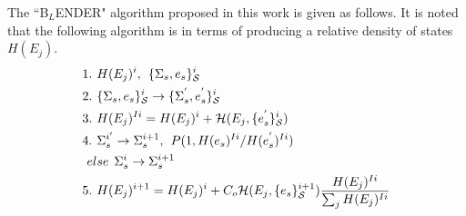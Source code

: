 \documentclass[twocolumn]{article}
\begin{document}
The ``B$_{L}$ENDER" algorithm proposed in this work  is given as follows. It is noted that the following algorithm is in terms of producing a relative density of states $H(E_j)$.  \\
\begin{equation}
\begin{split}
&1.\hspace{0.125cm} H(E_j)^i ,\hspace{0.15cm}  \{\Sigma_{s},e_s\}_{\mathcal{S}}^i\\
&2. \hspace{0.125cm}\{\Sigma_{s},e_s\}_{\mathcal{S}}^i \rightarrow  \{\Sigma_{s}^{'},e_s^{'}\}_{\mathcal{S}}^i\\
&3. \hspace{0.125cm}H(E_j)^{Ii} = H(E_j)^i + \mathcal{H}(E_j, \{e_{s}^{'}\}_{\mathcal{S}}^i) \\
&4. \hspace{0.125cm} \Sigma_{s}^{i'} \rightarrow \Sigma_{s}^{i+1}, \hspace{0.15cm} P(1, H(e_s)^{Ii}/H(e_s^{'})^{Ii})\\
& \hspace{0.125cm}else  \hspace{0.15cm} \Sigma_{s}^i \rightarrow \Sigma_{s}^{i+1}\\
&5. \hspace{0.125cm} H(E_j)^{i+1} = H(E_j)^{i} + C_o\mathcal{H}(E_j, \{e_s\}_{\mathcal{S}}^{i+1})\frac{H(E_j)^{Ii}}{\sum_j H(E_j)^{Ii} }\\
\end{split}
\end{equation}
\end{document}
